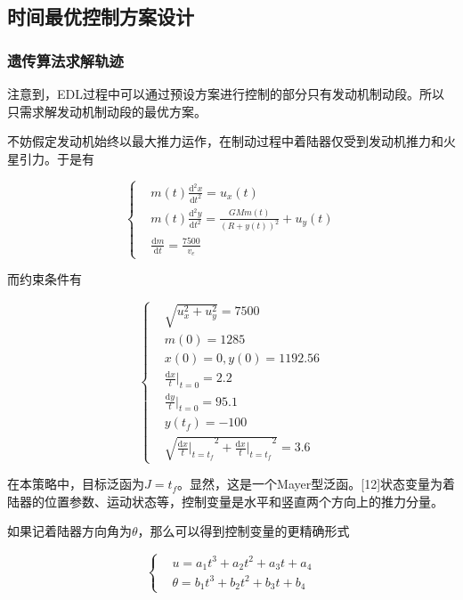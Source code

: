 \documentclass[UTF8,12pt]{ctexart}
\begin{document}
\newpage
\subsection{时间最优控制方案设计}
\subsubsection{遗传算法求解轨迹}

注意到，EDL过程中可以通过预设方案进行控制的部分只有发动机制动段。所以只需求解发动机制动段的最优方案。

不妨假定发动机始终以最大推力运作，在制动过程中着陆器仅受到发动机推力和火星引力。于是有

\begin{equation}
	\left\{
\begin{aligned}
	&m(t)\frac{\mathrm{d}^2x}{\mathrm{d}t^2}=u_x(t)\\
	&m(t)\frac{\mathrm{d}^2y}{\mathrm{d}t^2}=\frac{GMm(t)}{(R+y(t))^2}+u_y(t)\\
	&\frac{\mathrm{d}m}{\mathrm{d}t}=\frac{7500}{v_e}
\end{aligned}\right.
\end{equation}

而约束条件有

\begin{equation}
\left\{\begin{aligned}
&\sqrt{u_x^2+u_y^2}=7500\\
&m(0)=1285\\
&x(0)=0,y(0)=1192.56\\
&\frac{\mathrm{d}x}{t}|_{t=0}=2.2\\
&\frac{\mathrm{d}y}{t}|_{t=0}=95.1\\
&y(t_f)=-100\\
&\sqrt{{\frac{\mathrm{d}x}{t}|_{t=t_f}}^2+{\frac{\mathrm{d}x}{t}|_{t=t_f}}^2}=3.6
\end{aligned}\right.
\end{equation}

在本策略中，目标泛函为$J=t_f$。显然，这是一个Mayer型泛函。[12]状态变量为着陆器的位置参数、运动状态等，控制变量是水平和竖直两个方向上的推力分量。

如果记着陆器方向角为$\theta$，那么可以得到控制变量的更精确形式

\begin{equation}
	\left\{
	\begin{aligned}
		&u=a_1t^3+a_2t^2+a_3t+a_4\\
		&\theta=b_1t^3+b_2t^2+b_3t+b_4
	\end{aligned}
	\right.
\end{equation}
\end{document}

